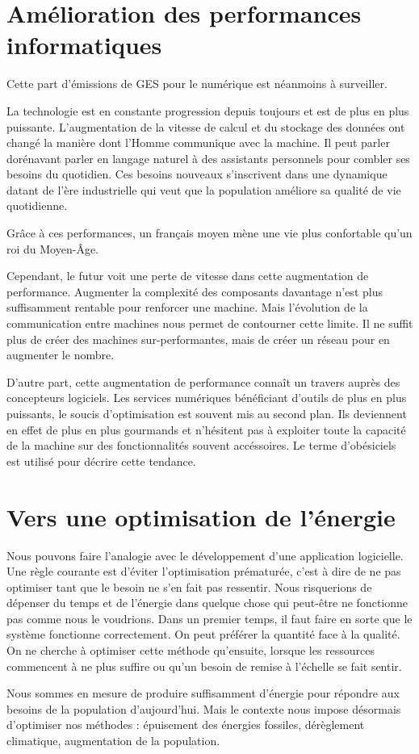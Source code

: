 \section{Amélioration des performances informatiques}

Cette part d'émissions de GES pour le numérique est néanmoins à surveiller.

La technologie est en constante progression depuis toujours et est de plus en plus puissante.
L'augmentation de la vitesse de calcul et du stockage des données ont changé la manière dont l'Homme communique avec la machine.
Il peut parler dorénavant parler en langage naturel à des assistants personnels pour combler ses besoins du quotidien.
Ces besoins nouveaux s'inscrivent dans une dynamique datant de l'ère industrielle qui veut que
la population améliore sa qualité de vie quotidienne.

Grâce à ces performances, un français moyen mène une vie plus confortable qu'un roi du Moyen-Âge.

Cependant, le futur voit une perte de vitesse dans cette augmentation de performance.
Augmenter la complexité des composants davantage n'est plus suffisamment rentable pour renforcer une machine.
Mais l'évolution de la communication entre machines nous permet de contourner cette limite.
Il ne suffit plus de créer des machines sur-performantes, mais de créer un
réseau pour en augmenter le nombre.


D'autre part, cette augmentation de performance connaît un travers auprès des concepteurs logiciels.
Les services numériques bénéficiant d'outils de plus en plus puissants, le soucis d'optimisation est souvent mis au second plan.
Ils deviennent en effet de plus en plus gourmands et n'hésitent pas à exploiter toute la capacité de la machine sur des fonctionnalités souvent accéssoires.
Le terme d'obésiciels est utilisé pour décrire cette tendance.

\section{Vers une optimisation de l'énergie}

Nous pouvons faire l’analogie avec le développement d'une application logicielle. Une règle courante est d’éviter
l’optimisation prématurée, c’est à dire de ne pas optimiser tant que le besoin ne s’en fait pas
ressentir. Nous risquerions de dépenser du temps et de l'énergie dans quelque chose qui
peut-être ne fonctionne pas comme nous le voudrions.
Dans un premier temps, il faut faire en sorte que le système fonctionne correctement.
On peut préférer la quantité face à la qualité. On ne cherche à optimiser cette méthode
qu’ensuite, lorsque les ressources commencent à ne plus suffire ou qu’un besoin de remise
à l’échelle se fait sentir.

Nous sommes en mesure de produire suffisamment d’énergie pour répondre aux
besoins de la population d'aujourd'hui. Mais le contexte nous impose désormais d’optimiser
nos méthodes : épuisement des énergies fossiles, dérèglement climatique, augmentation de la
population.




